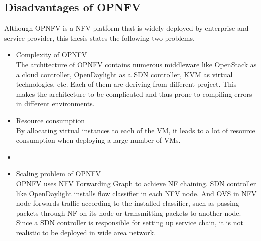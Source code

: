 \subsection{Disadvantages of OPNFV}
Although OPNFV is a NFV platform that is widely deployed by enterprise and service provider, this thesis states the following two problems.
\begin{itemize}
	\item Complexity of OPNFV \\
		The architecture of OPNFV contains numerous middleware like OpenStack as a cloud controller, OpenDaylight as a SDN controller, KVM as virtual technologies, etc. Each of them are deriving from different project. This makes the architecture to be complicated and thus prone to compiling errors in different environments. 
	\item Resource consumption \\
		By allocating virtual instances to each of the VM, it leads to a lot of resource consumption when deploying a large number of VMs. 
	\item 
	\item Scaling problem of OPNFV \\
		OPNFV uses NFV Forwarding Graph to achieve NF chaining. SDN controller like OpenDaylight installs flow classifier in each NFV node. And OVS in NFV node forwards traffic according to the installed classifier, such as passing packets through NF on its node or transmitting packets to another node. Since a SDN controller is responsible for setting up service chain, it is not realistic to be deployed in wide area network. 
\end{itemize}



